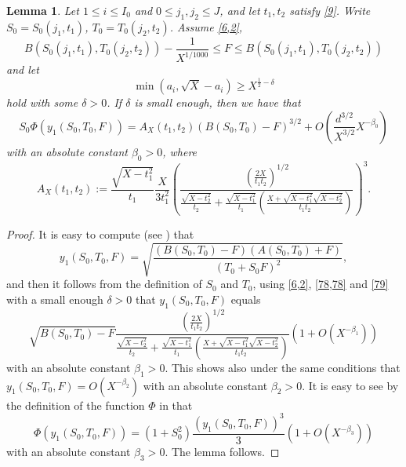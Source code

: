 \documentclass[12pt]{amsart}
\newtheorem{lemma}[theorem]{Lemma}
\theoremstyle{definition}
\numberwithin{equation}{section}
\begin{document}
\begin{lemma}\label{lem:5}Let $1\le i\le I_0$ and $0\le j_1,j_2\le
J$,
and let $t_1,t_2$ satisfy \eqref{9}. Write $S_0=S_0\left(j_1,t_1\right
)$,
$T_0=T_0\left(j_2,t_2\right)$. Assume \eqref{6,2},
\begin{equation}B\left(S_0\left(j_1,t_1\right),T_0\left(j_2,t_2\right
)\right)-\frac 1{X^{1/1000}}\le F\le B\left(S_0\left(j_1,t_1\right
),T_0\left(j_2,t_2\right)\right)\label{78,78}\end{equation}
and let
\begin{equation}\min\left(a_i,\sqrt {X}-a_i\right)\ge X^{\frac 12
-\delta}\label{79}\end{equation}
hold with some $\delta >0$. If $\delta$ is small enough, then we have that
\[S_0\Phi\left(y_1\left(S_0,T_0,F\right)\right)=A_X\left(t_1,t_2\right
)\left(B\left(S_0,T_0\right)-F\right)^{3/2}+O\left(\frac {d^{3/2}}{
X^{3/2}}X^{-\beta_0}\right)\]
with an absolute constant $\beta_0>0$, where
\begin{equation}A_X\left(t_1,t_2\right):=\frac {\sqrt {X-t_1^2}}{
t_1}\frac X{3t_1^2}\left(\frac {\left(\frac {2X}{t_1t_2}\right)^{
1/2}}{\frac {\sqrt {X-t_2^2}}{t_2}+\frac {\sqrt {X-t_1^2}}{t_1}\left
(\frac {X+\sqrt {X-t_1^2}\sqrt {X-t_2^2}}{t_1t_2}\right)}\right)^
3.\label{79,1}\end{equation}
\end{lemma}
\begin{proof}It is easy to compute (see \cite[(6.65)]{Biro}) that
\[y_1\left(S_0,T_0,F\right)=\sqrt {\frac {\left(B\left(S_0,T_0\right
)-F\right)\left(A\left(S_0,T_0\right)+F\right)}{\left(T_0+S_0F\right
)^2}},\]
and then it follows from the definition of $S_0$ and $T_0$,
using \eqref{6,2}, \eqref{78,78} and \eqref{79} with a small enough $
\delta >0$ that $y_1\left(S_0,T_0,F\right)$ equals
\[\sqrt {B\left(S_0,T_0\right)-F}\frac {\left(\frac {2X}{t_1t_2}\right
)^{1/2}}{\frac {\sqrt {X-t_2^2}}{t_2}+\frac {\sqrt {X-t_1^2}}{t_1}\left
(\frac {X+\sqrt {X-t_1^2}\sqrt {X-t_2^2}}{t_1t_2}\right)}\left(1+
O\left(X^{-\beta_1}\right)\right)\]
with an absolute constant $\beta_1>0$. This shows also under the
same conditions that $y_1\left(S_0,T_0,F\right)=O\left(X^{-\beta_
2}\right)$ with an
absolute constant $\beta_2>0$. It is easy to see by the
definition of the function $\Phi$ in \cite[Lemma 4.3]{Biro} that
\[\Phi\left(y_1\left(S_0,T_0,F\right)\right)=\left(1+S_0^2\right)\frac {\left
(y_1\left(S_0,T_0,F\right)\right)^3}3\left(1+O\left(X^{-\beta_3}\right
)\right)\]
with an absolute constant $\beta_3>0$. The lemma follows.
\end{proof}
\end{document}
